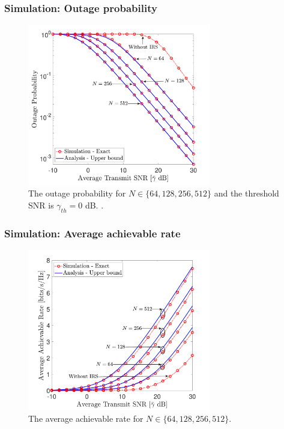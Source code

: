 \documentclass[article,mathserif,10pt,envcountsect]{beamer}
\begin{document}
\begin{frame}
	\frametitle{Simulation: Outage probability}
	\vspace{-2.6mm}
\begin{figure}
\centering
\includegraphics[width=8cm]{outage_L_64_128_256_512_without}\vspace{-3mm}
\caption{The outage probability for $N \in \{64,128,256,512\}$ and the threshold SNR is  $\gamma_{th}=0$ dB. .}
\label{fig:outage_L_64_128_256_512_without}
\end{figure}
\end{frame}
\begin{frame}
	\frametitle{Simulation: Average achievable rate}
	\vspace{-2.6mm}
	\begin{figure}
		\centering
		\includegraphics[width=8cm]{rate_L_64_128_256_512_without}\vspace{-3mm}
		\caption{The average achievable rate for $N \in \{64,128,256,512\}$.}
		\label{fig:rate_L_64_128_256_512_without}
	\end{figure}
\end{frame}
\end{document}
